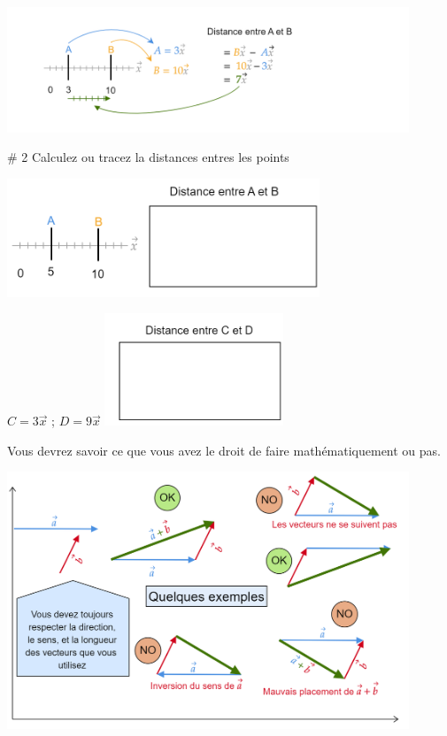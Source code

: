 \documentclass[12pt]{article}
\begin{document}
            \begin{center}
            \includegraphics[width=0.9\textwidth]{DD4.png}
            \end{center}


\begin{problem}{\# 2 Calculez ou tracez la distances entres les points}
    
        \begin{center}
            \includegraphics[width=0.7\textwidth]{DD9.png}
        \end{center}

   \begin{center}
    $C = 3 \Vec{x}$ ; $D = 9 \Vec{x}$  \hspace{2cm}          \includegraphics[width=0.4\textwidth]{DD10.png}
    \end{center}

\end{problem}


\newpage
\noindent
Vous devrez savoir ce que vous avez le droit de faire mathématiquement ou pas.

            \begin{center}
            \includegraphics[width=0.9\textwidth]{DD5.png}
            \end{center}
\end{document}
